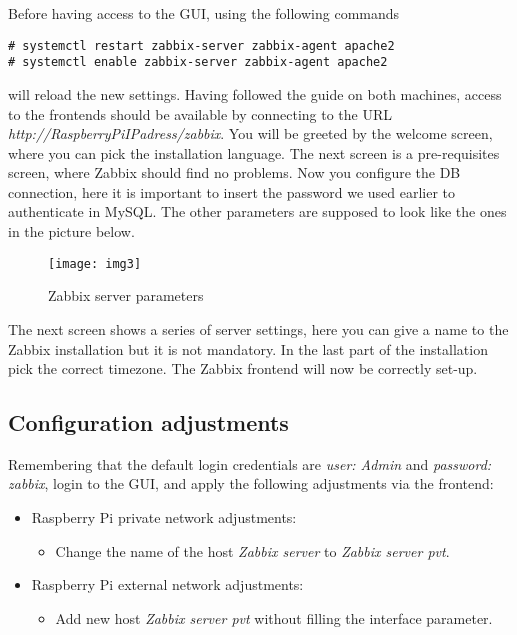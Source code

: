 \documentclass[a4paper,11pt]{scrartcl}
\begin{document}
Before having access to the GUI, using the following commands
\begin{lstlisting}
# systemctl restart zabbix-server zabbix-agent apache2
# systemctl enable zabbix-server zabbix-agent apache2
\end{lstlisting}
will reload the new settings.
Having followed the guide on both machines, access to the frontends should be available by connecting to the URL \textit{http://RaspberryPiIPadress/zabbix}. You will be greeted by the welcome screen, where you can pick the installation language. The next screen is a pre-requisites screen, where Zabbix should find no problems. 
Now you configure the DB connection, here it is important to insert the password we used earlier to authenticate in MySQL. The other parameters are supposed to look like the ones in the picture below.
\begin{figure}[h]
    \centering 
    \texttt{[image: img3]}
    \label{fig:figure2}
    \caption{Zabbix server parameters}
\end{figure}

The next screen shows a series of server settings, here you can give a name to the Zabbix installation but it is not mandatory. In the last part of the installation pick the correct timezone. The Zabbix frontend will now be correctly set-up.

\subsection{Configuration adjustments}
Remembering that the default login credentials are \textit{user: Admin} and \textit{password: zabbix}, login to the GUI, and apply the following adjustments via the frontend:
\begin{itemize}
    \item Raspberry Pi private network adjustments:
    \begin{itemize}
        \item Change the name of the host \textit{Zabbix server} to \textit{Zabbix server pvt}.
    \end{itemize}
    \item Raspberry Pi external network adjustments:
    \begin{itemize}
        \item Add new host \textit{Zabbix server pvt} without filling the interface parameter.
    \end{itemize}
\end{itemize}
\end{document}
